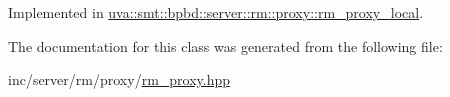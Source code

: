 Implemented in \hyperlink{classuva_1_1smt_1_1bpbd_1_1server_1_1rm_1_1proxy_1_1rm__proxy__local_a3a26102b7b9b3ecc4d1a8627751406a6}{uva\+::smt\+::bpbd\+::server\+::rm\+::proxy\+::rm\+\_\+proxy\+\_\+local}.



The documentation for this class was generated from the following file\+:\begin{DoxyCompactItemize}
\item 
inc/server/rm/proxy/\hyperlink{rm__proxy_8hpp}{rm\+\_\+proxy.\+hpp}\end{DoxyCompactItemize}
